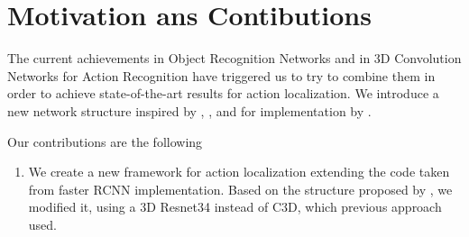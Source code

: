 \documentclass{report}
\begin{document}
\section{Motivation ans Contibutions}
The current achievements in Object Recognition Networks and in 3D Convolution Networks for Action Recognition have triggered us to try
to combine them in order to achieve state-of-the-art results for action localization. We introduce a new network structure inspired by
\cite{DBLP:journals/corr/HouCS17}, \cite{DBLP:journals/corr/abs-1712-09184},\cite{Ren:2015:FRT:2969239.2969250} and for implementation
by \cite{jjfaster2rcnn}.

Our contributions are the following
\begin{enumerate}
\item We create a new framework for action localization extending the code taken from faster RCNN implementation. Based on the structure
  proposed by \cite{DBLP:journals/corr/HouCS17}, we modified it, using a 3D Resnet34 instead of C3D, which previous approach used.


\end{enumerate}
\end{document}
